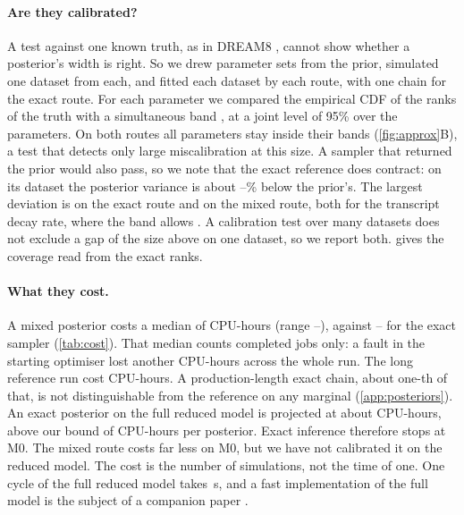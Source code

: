 \paragraph{Are they calibrated?} A test against one known truth, as in DREAM8
\cite{karr2015summary}, cannot show whether a posterior's width is right. So we drew
 parameter sets from the prior,
simulated one dataset from each, and fitted each dataset by each route, with one chain for the exact route. For each
parameter we compared the empirical CDF of the ranks of the truth with a
simultaneous band \cite{sailynoja2022graphical}, at a joint level of 95\% over the
 parameters. On both routes all  parameters stay inside their bands (\cref{fig:approx}B), a test that detects only large miscalibration at this size. A sampler that returned the prior would also pass, so we note that the exact reference does contract: on its dataset the posterior variance is about --\% below the prior's. The largest deviation is  on the exact route and  on the mixed route, both for the
transcript decay rate, where the band allows . A calibration test
over many datasets does not exclude a gap of the size above on one dataset, so we report
both.  gives the coverage read from the exact ranks.

\paragraph{What they cost.} A mixed posterior costs a median of  CPU-hours
(range --), against --
for the exact sampler (\cref{tab:cost}). That median counts completed jobs only: a fault in the
starting optimiser lost another  CPU-hours across the whole run. The long reference run cost
 CPU-hours. A production-length exact chain, about one-th of that, is not distinguishable from the reference on
any marginal (\cref{app:posteriors}). An exact posterior on
the full reduced model is projected at about  CPU-hours, above
our bound of  CPU-hours per posterior. Exact inference therefore
stops at M0. The mixed route costs far less on M0, but we have not calibrated it on the
reduced model. The cost is the number of simulations, not the time of one. One cycle
of the full reduced model takes \,s, and a fast
implementation of the full \syn{} model is the subject of a companion paper
\cite{kimpson2026whole}.


